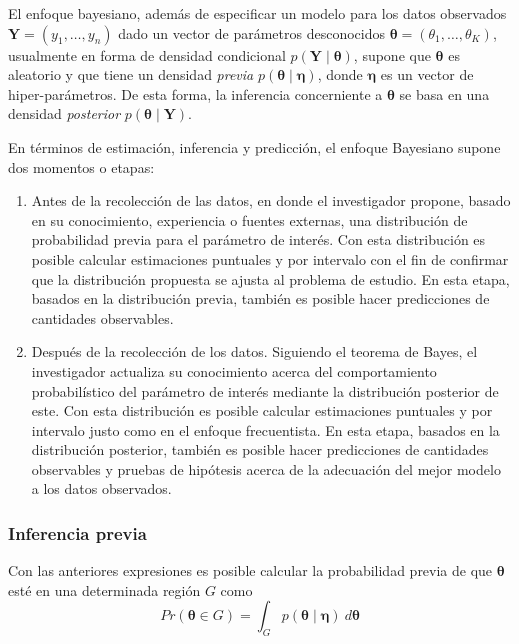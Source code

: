 \documentclass[
  10pt,
  spanish,
]{book}
\theoremstyle{definition}
\theoremstyle{definition}
\theoremstyle{definition}
\theoremstyle{definition}
\theoremstyle{remark}
\begin{document}
El enfoque bayesiano, además de especificar un modelo para los datos
observados \(\mathbf{Y}=(y_1,\ldots,y_n)\) dado un vector de parámetros
desconocidos \(\boldsymbol \theta=(\theta_1,\ldots,\theta_K)\), usualmente en forma
de densidad condicional \(p(\mathbf{Y} \mid \boldsymbol \theta)\), supone que
\(\boldsymbol \theta\) es aleatorio y que tiene un densidad \emph{previa}
\(p(\boldsymbol \theta\mid \boldsymbol \eta)\), donde \(\boldsymbol \eta\) es un vector de hiper-parámetros.
De esta forma, la inferencia concerniente a \(\boldsymbol \theta\) se basa en una
densidad \emph{posterior} \(p(\boldsymbol \theta\mid \mathbf{Y})\).

En términos de estimación, inferencia y predicción, el enfoque Bayesiano
supone dos momentos o etapas:

\begin{enumerate}
\def\labelenumi{\arabic{enumi}.}
\item
  Antes de la recolección de las datos, en donde el investigador propone,
  basado en su conocimiento, experiencia o fuentes externas, una
  distribución de probabilidad previa para el parámetro de interés.
  Con esta distribución es posible calcular estimaciones puntuales y por
  intervalo con el fin de confirmar que la distribución propuesta se
  ajusta al problema de estudio. En esta etapa, basados en la distribución
  previa, también es posible hacer predicciones de cantidades
  observables.
\item
  Después de la recolección de los datos. Siguiendo el teorema de Bayes,
  el investigador actualiza su conocimiento acerca del comportamiento
  probabilístico del parámetro de interés mediante la distribución
  posterior de este. Con esta distribución es posible calcular
  estimaciones puntuales y por intervalo justo como en el enfoque
  frecuentista. En esta etapa, basados en la distribución
  posterior, también es posible hacer predicciones de cantidades
  observables y pruebas de hipótesis acerca de la adecuación del mejor
  modelo a los datos observados.
\end{enumerate}

\hypertarget{inferencia-previa}{%
\subsubsection*{Inferencia previa}\label{inferencia-previa}}

Con las anteriores expresiones es posible calcular la probabilidad
previa de que \(\boldsymbol \theta\) esté en una determinada región \(G\) como
\begin{equation}
Pr(\boldsymbol \theta\in G)=\int_G p(\boldsymbol \theta\mid \boldsymbol \eta)\ d\boldsymbol \theta
\end{equation}
\end{document}
